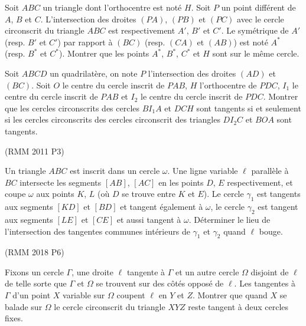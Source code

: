 \begin{exo}

Soit $ABC$ un triangle dont l'orthocentre est noté $H$. Soit $P$ un point différent de $A$, $B$ et $C$. L'intersection des droites $(PA)$, $(PB)$ et $(PC)$ avec le cercle circonscrit du triangle $ABC$ est respectivement $A'$, $B'$ et $C'$. Le symétrique de $A'$ (resp. $B'$ et $C'$) par rapport à $(BC)$ (resp. $(CA)$ et $(AB)$) est noté $A^*$ (resp. $B^*$ et $C^*$). Montrer que les points $A^*$, $B^*$, $C^*$ et $H$ sont sur le même cercle.
\end{exo}

\begin{exo}

Soit $ABCD$ un quadrilatère, on note $P$ l'intersection des droites $(AD)$ et $(BC)$. Soit $O$ le centre du cercle inscrit de $PAB$, $H$ l'orthocentre de $PDC$, $I_1$ le centre du cercle inscrit de $PAB$ et $I_2$ le centre du cercle inscrit de $PDC$. Montrer que les cercles circonscrits des cercles $BI_1A$ et $DCH$ sont tangents si et seulement si les cercles circonscrits des cercles circonscrit des triangles $DI_2C$ et $BOA$ sont tangents.
\end{exo}

\begin{exo}(RMM 2011 P3)

Un triangle $ABC$ est inscrit dans un cercle $\omega$.
Une ligne variable $\ell$ parallèle à $BC$ intersecte les segments $[AB]$, $[AC]$ en les points $D$, $E$ respectivement, et coupe $\omega$ aux points $K$, $L$ (où $D$ se trouve entre $K$ et $E$).
Le cercle $\gamma_1$ est tangents aux segments $[KD]$ et $[BD]$ et tangent également à $\omega$, le cercle $\gamma_2$ est tangent aux segments $[LE]$ et $[CE]$ et aussi tangent à $\omega$.
Déterminer le lieu de l'intersection des tangentes communes intérieurs de $\gamma_1$ et $\gamma_2$ quand $\ell$ bouge.
\end{exo}


\begin{exo}(RMM 2018 P6)

Fixons un cercle $\Gamma$, une droite $\ell$ tangente à $\Gamma$ et un autre cercle $\Omega$ disjoint de $\ell$ de telle sorte que $\Gamma$ et $\Omega$ se trouvent sur des côtés opposé de $\ell$. Les tangentes à $\Gamma$ d'un point $X$ variable sur $\Omega$ coupent $\ell$ en $Y$ et $Z$. Montrer que quand $X$ se balade sur $\Omega$ le cercle circonscrit du triangle $XYZ$ reste tangent à deux cercles fixes.
\end{exo}

